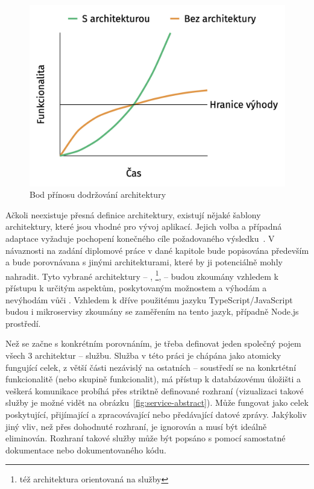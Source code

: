 \begin{figure}[htbp]
   \centering
   \includegraphics[max width=\textwidth]{assets/draft-architecture-line}
   \caption{Bod přínosu dodržování architektury~\cite{archoworthit}}\label{fig:architecture-line}
\end{figure}


Ačkoli neexistuje přesná definice architektury, existují nějaké šablony architektury, které jsou vhodné pro vývoj aplikací.
Jejich volba a případná adaptace vyžaduje pochopení konečného cíle požadovaného výsledku~\cite{softarch}.
V návaznosti na zadání diplomové práce v dané kapitole bude popisována především  a bude porovnávana s jinými architekturami, které by ji potenciálně mohly nahradit.
Tyto vybrané architektury – , \footnote{též architektura orientovaná na služby},  – budou zkoumány vzhledem k přístupu k určitým aspektům, poskytovaným možnostem a výhodám a nevýhodám vůči .
Vzhledem k dříve použitému jazyku TypeScript/JavaScript budou i mikroservisy zkoumány se zaměřením na tento jazyk, případně Node.js prostředí.


Než se začne s konkrétním porovnáním, je třeba definovat jeden společný pojem všech 3 architektur – službu.
Služba v této práci je chápána jako atomicky fungující celek, z větší části nezávislý na ostatních – soustředí se na konkrtétní funkcionalitě (nebo skupině funkcionalit), má přístup k databázovému úložišti a veškerá komunikace probíhá přes striktně definované rozhraní (vizualizaci takové služby je možné vidět na obrázku~\ref{fig:service-abstract}).
Může fungovat jako celek poskytující, přijímající a zpracovávající nebo předávající datové zprávy.
Jakýkoliv jiný vliv, než přes dohodnuté rozhraní, je ignorován a musí být ideálně eliminován.
Rozhraní takové služby může být popsáno s pomocí samostatné dokumentace nebo dokumentovaného kódu.


